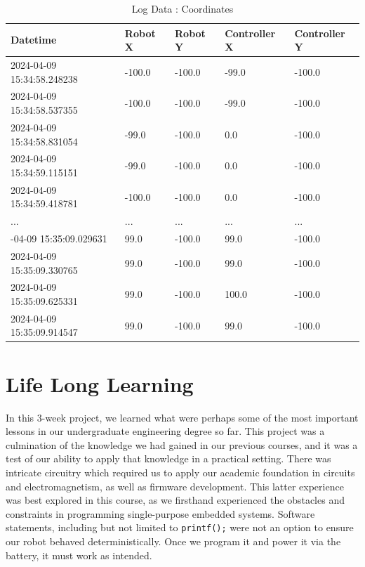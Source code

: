 \documentclass{article}
\begin{document}
\begin{table}[ht]
    \centering
    \begin{tabular}{@{}lllll@{}}
    \toprule
    \textbf{Datetime}                & \textbf{Robot X} & \textbf{Robot Y} & \textbf{Controller X} & \textbf{Controller Y} \\ \midrule
    2024-04-09 15:34:58.248238 & -100.0         & -100.0         & -99.0             & -100.0            \\
    2024-04-09 15:34:58.537355 & -100.0         & -100.0         & -99.0             & -100.0            \\
    2024-04-09 15:34:58.831054 & -99.0          & -100.0         & 0.0               & -100.0            \\
    2024-04-09 15:34:59.115151 & -99.0          & -100.0         & 0.0               & -100.0            \\
    2024-04-09 15:34:59.418781 & -100.0         & -100.0         & 0.0               & -100.0            \\ \addlinespace
    ...                            & ...            & ...            & ...               & ...               \\ \addlinespace
    2024-04-09 15:35:09.029631 & 99.0           & -100.0         & 99.0              & -100.0            \\
    2024-04-09 15:35:09.330765 & 99.0           & -100.0         & 99.0              & -100.0            \\
    2024-04-09 15:35:09.625331 & 99.0           & -100.0         & 100.0             & -100.0            \\
    2024-04-09 15:35:09.914547 & 99.0           & -100.0         & 99.0              & -100.0            \\ \bottomrule
    \end{tabular}
    \caption{Log Data : Coordinates}
    \label{table:coordinates_log_table}
\end{table}

\section{Life Long Learning}

In this 3-week project, we learned what were perhaps some of the most important lessons in our undergraduate engineering degree so far. This project was a
culmination of the knowledge we had gained in our previous courses, and it was a test of our ability to apply that knowledge in a practical setting. There was
intricate circuitry which required us to apply our academic foundation in circuits and electromagnetism, as well as firmware development. This latter experience was
best explored in this course, as we firsthand experienced the obstacles and constraints in programming single-purpose embedded systems. Software statements, including but not limited to
\texttt{printf();} were not an option to ensure our robot behaved deterministically. Once we program it and power it via the battery, it must work as intended.
\end{document}
